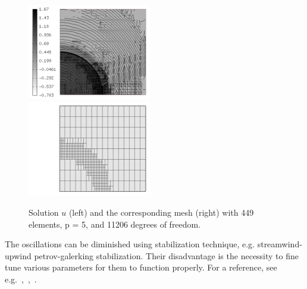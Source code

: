 \begin{figure}[H]
\begin{center}
\includegraphics[width=0.48\textwidth]{minor_examples/FEM02.png}\ \ \ 
\includegraphics[width=0.48\textwidth]{minor_examples/FEM02Mesh.png}
\end{center}
\vspace{-4mm}
\caption{Solution $u$ (left) and the corresponding mesh (right) with 449 elements, p = 5, and 11206 degrees of freedom.}
\end{figure}
	The oscillations can be diminished using stabilization technique, e.g. streamwind-upwind petrov-galerking stabilization. Their disadvantage is the necessity to fine tune various parameters for them to function properly. For a reference, see e.g.~\cite{Knobloch_1},~\cite{Knobloch_2},~\cite{SUPG}.

